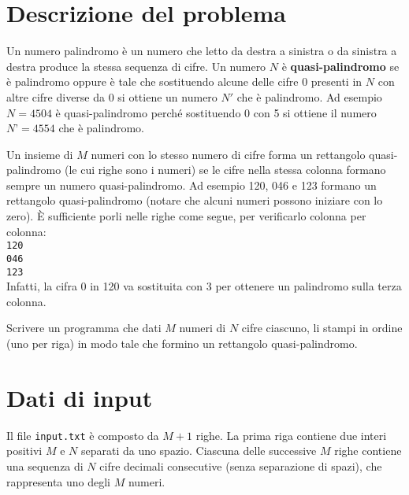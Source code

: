 \documentclass[a4paper,11pt]{article}
\begin{document}
\vspace{0.5cm}



\vspace{0.5cm}

\section*{Descrizione del problema}
   
Un numero palindromo è un numero che letto da destra a sinistra o da
sinistra a destra produce la stessa sequenza di cifre. Un numero 
$N$ è
\textbf{quasi-palindromo} se è palindromo oppure è tale che
sostituendo alcune delle cifre 0 presenti in $N$ con altre
cifre diverse da 0 si
ottiene un numero $N'$ che è palindromo. Ad esempio $N =
4504$ è quasi-palindromo perché sostituendo 0 con 5 si ottiene il
numero $N’ = 4554$ che è palindromo.

Un insieme di $M$ numeri con lo stesso numero di cifre
forma un rettangolo quasi-palindromo (le cui righe sono i numeri) se
le cifre nella stessa colonna formano sempre un numero quasi-palindromo. Ad
esempio 120, 046 e 123 formano un rettangolo quasi-palindromo (notare
che alcuni numeri possono iniziare con lo zero). È sufficiente porli
nelle righe come segue, per verificarlo colonna per colonna:\\
\texttt{120}\\
\texttt{046}\\
\texttt{123}\\
Infatti, la cifra 0 in 120 va sostituita con 3 per ottenere un palindromo sulla terza colonna.

Scrivere un programma che dati $M$ numeri di $N$
cifre ciascuno, li stampi in ordine
(uno per riga) in modo tale che formino un rettangolo quasi-palindromo.


\section*{Dati di input}
  
Il file \texttt{input.txt} è composto da $M+1$ righe.  La prima
riga contiene due  interi positivi $M$ e $N$
separati da uno spazio. Ciascuna delle successive $M$ righe contiene una sequenza di
$N$ cifre decimali consecutive (senza separazione di spazi),
che rappresenta uno degli $M$ numeri. 
\end{document}
